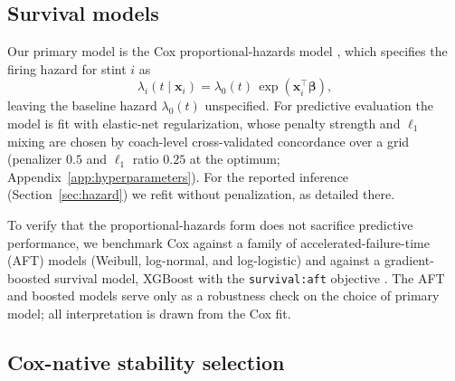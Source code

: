 \documentclass[USenglish]{article}
\theoremstyle{dgthm}
\theoremstyle{dgdef}
\begin{document}
\subsection{Survival models}
\label{sec:models}

Our primary model is the Cox proportional-hazards model \citep{cox1972}, which specifies the firing hazard for stint $i$ as
\begin{equation}
\lambda_i(t \mid \mathbf{x}_i) = \lambda_0(t)\,\exp(\mathbf{x}_i^\top \boldsymbol{\beta}),
\label{eq:cox}
\end{equation}
leaving the baseline hazard $\lambda_0(t)$ unspecified. For predictive evaluation the model is fit with elastic-net regularization, whose penalty strength and $\ell_1$ mixing are chosen by coach-level cross-validated concordance over a grid (penalizer $0.5$ and $\ell_1$ ratio $0.25$ at the optimum; Appendix~\ref{app:hyperparameters}). For the reported inference (Section~\ref{sec:hazard}) we refit without penalization, as detailed there.

To verify that the proportional-hazards form does not sacrifice predictive performance, we benchmark Cox against a family of accelerated-failure-time (AFT) models (Weibull, log-normal, and log-logistic) and against a gradient-boosted survival model, XGBoost with the \texttt{survival:aft} objective \citep{chen2016}. The AFT and boosted models serve only as a robustness check on the choice of primary model; all interpretation is drawn from the Cox fit.

\subsection{Cox-native stability selection}
\label{sec:selection}
\end{document}
